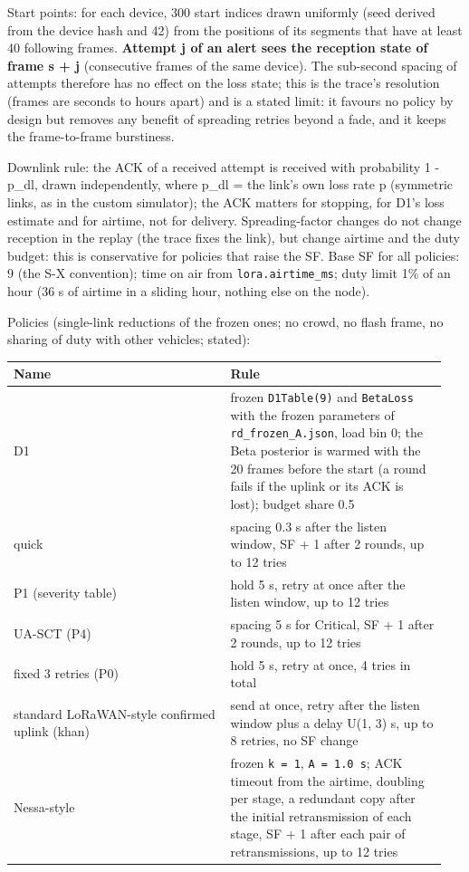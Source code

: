 Start points: for each device, 300 start indices drawn uniformly (seed derived from the device hash and 42) from the positions of its segments that have at least 40 following frames. \textbf{Attempt j of an alert sees the reception state of frame s + j} (consecutive frames of the same device). The sub-second spacing of attempts therefore has no effect on the loss state; this is the trace's resolution (frames are seconds to hours apart) and is a stated limit: it favours no policy by design but removes any benefit of spreading retries beyond a fade, and it keeps the frame-to-frame burstiness.

Downlink rule: the ACK of a received attempt is received with probability 1 - p\_dl, drawn independently, where p\_dl = the link's own loss rate p (symmetric links, as in the custom simulator); the ACK matters for stopping, for D1's loss estimate and for airtime, not for delivery. Spreading-factor changes do not change reception in the replay (the trace fixes the link), but change airtime and the duty budget: this is conservative for policies that raise the SF. Base SF for all policies: 9 (the S-X convention); time on air from \texttt{lora.airtime\_ms}; duty limit 1\% of an hour (36 s of airtime in a sliding hour, nothing else on the node).

Policies (single-link reductions of the frozen ones; no crowd, no flash frame, no sharing of duty with other vehicles; stated):

{\scriptsize\raggedright
\begin{longtable}{p{0.475\linewidth}p{0.475\linewidth}}
\toprule
Name & Rule \\
\midrule
\endhead
D1 & frozen \texttt{D1Table(9)} and \texttt{BetaLoss} with the frozen parameters of \texttt{rd\_frozen\_A.json}, load bin 0; the Beta posterior is warmed with the 20 frames before the start (a round fails if the uplink or its ACK is lost); budget share 0.5 \\
quick & spacing 0.3 s after the listen window, SF + 1 after 2 rounds, up to 12 tries \\
P1 (severity table) & hold 5 s, retry at once after the listen window, up to 12 tries \\
UA-SCT (P4) & spacing 5 s for Critical, SF + 1 after 2 rounds, up to 12 tries \\
fixed 3 retries (P0) & hold 5 s, retry at once, 4 tries in total \\
standard LoRaWAN-style confirmed uplink (khan) & send at once, retry after the listen window plus a delay U(1, 3) s, up to 8 retries, no SF change \\
Nessa-style & frozen \texttt{k = 1}, \texttt{A = 1.0 s}; ACK timeout from the airtime, doubling per stage, a redundant copy after the initial retransmission of each stage, SF + 1 after each pair of retransmissions, up to 12 tries \\
\bottomrule
\end{longtable}}

